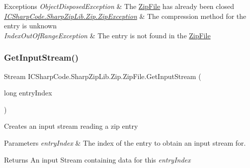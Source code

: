 \begin{DoxyExceptions}{Exceptions}
{\em Object\+Disposed\+Exception} & The \hyperlink{class_i_c_sharp_code_1_1_sharp_zip_lib_1_1_zip_1_1_zip_file}{Zip\+File} has already been closed \\
\hline
{\em \hyperlink{class_i_c_sharp_code_1_1_sharp_zip_lib_1_1_zip_1_1_zip_exception}{I\+C\+Sharp\+Code.\+Sharp\+Zip\+Lib.\+Zip.\+Zip\+Exception}} & The compression method for the entry is unknown \\
\hline
{\em Index\+Out\+Of\+Range\+Exception} & The entry is not found in the \hyperlink{class_i_c_sharp_code_1_1_sharp_zip_lib_1_1_zip_1_1_zip_file}{Zip\+File} \\
\hline
\end{DoxyExceptions}
\mbox{\label{class_i_c_sharp_code_1_1_sharp_zip_lib_1_1_zip_1_1_zip_file_a49342918dbb019fef268576705e573d3}} 
\subsubsection{\texorpdfstring{Get\+Input\+Stream()}{GetInputStream()}\hspace{0.1cm}{\footnotesize\ttfamily [2/2]}}
{\footnotesize\ttfamily Stream I\+C\+Sharp\+Code.\+Sharp\+Zip\+Lib.\+Zip.\+Zip\+File.\+Get\+Input\+Stream (\begin{DoxyParamCaption}\item[{long}]{entry\+Index }\end{DoxyParamCaption})\hspace{0.3cm}{\ttfamily [inline]}}



Creates an input stream reading a zip entry 


\begin{DoxyParams}{Parameters}
{\em entry\+Index} & The index of the entry to obtain an input stream for.\\
\hline
\end{DoxyParams}
\begin{DoxyReturn}{Returns}
An input Stream containing data for this {\itshape entry\+Index}  
\end{DoxyReturn}

